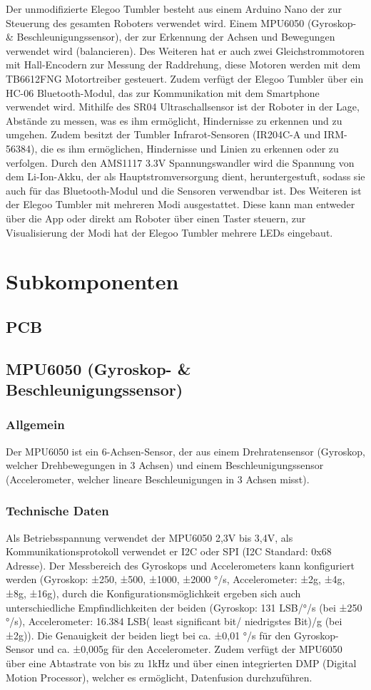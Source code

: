 Der unmodifizierte Elegoo Tumbler besteht aus einem Arduino Nano der zur Steuerung des gesamten Roboters verwendet wird. 
Einem MPU6050 (Gyroskop- \& Beschleunigungssensor), der zur Erkennung der Achsen und Bewegungen verwendet wird (balancieren). 
Des Weiteren hat er auch zwei Gleichstrommotoren mit Hall-Encodern zur Messung der Raddrehung, diese Motoren werden mit dem TB6612FNG Motortreiber gesteuert. 
Zudem verfügt der Elegoo Tumbler über ein HC-06 Bluetooth-Modul, das zur Kommunikation mit dem Smartphone verwendet wird. Mithilfe des SR04 Ultraschallsensor ist der Roboter in der Lage, 
Abstände zu messen, was es ihm ermöglicht, Hindernisse zu erkennen und zu umgehen.  
Zudem besitzt der Tumbler Infrarot-Sensoren (IR204C-A und IRM-56384), die es ihm ermöglichen, Hindernisse und Linien zu erkennen oder zu verfolgen. 
Durch den AMS1117 3.3V Spannungswandler wird die Spannung von dem Li-Ion-Akku, der als Hauptstromversorgung dient, heruntergestuft, 
sodass sie auch für das Bluetooth-Modul und die Sensoren verwendbar ist. Des Weiteren ist der Elegoo Tumbler mit mehreren Modi ausgestattet. 
Diese kann man entweder über die App oder direkt am Roboter über einen Taster steuern, zur Visualisierung der Modi hat der Elegoo Tumbler mehrere LEDs eingebaut.
\section{Subkomponenten}
\label{subsec:subkomponenten}
%
\subsection{PCB}
%
\subsection{MPU6050 (Gyroskop- \& Beschleunigungssensor)}
%
\subsubsection{Allgemein}
Der MPU6050 ist ein 6-Achsen-Sensor, der aus einem Drehratensensor (Gyroskop, welcher Drehbewegungen in 3 Achsen) und 
einem Beschleunigungssensor (Accelerometer, welcher lineare Beschleunigungen in 3 Achsen misst).
\subsubsection{Technische Daten}
Als Betriebsspannung verwendet der MPU6050 2,3V bis 3,4V, als Kommunikationsprotokoll verwendet er I2C oder SPI (I2C Standard: 0x68 Adresse). 
Der Messbereich des Gyroskops und Accelerometers kann konfiguriert werden (Gyroskop:  ±250, ±500, ±1000, ±2000 °/s, Accelerometer: ±2g, ±4g, ±8g, ±16g), 
durch die Konfigurationsmöglichkeit ergeben sich auch unterschiedliche Empfindlichkeiten der beiden (Gyroskop: 131 LSB/°/s (bei ±250 °/s), 
Accelerometer: 16.384 LSB( least significant bit/ niedrigstes Bit)/g (bei ±2g)).  
Die Genauigkeit der beiden liegt bei ca. ±0,01 °/s für den Gyroskop-Sensor und ca. ±0,005g für den Accelerometer. 
Zudem verfügt der MPU6050 über eine Abtastrate von bis zu 1kHz und über einen integrierten DMP (Digital Motion Processor), welcher es ermöglicht, Datenfusion durchzuführen.
